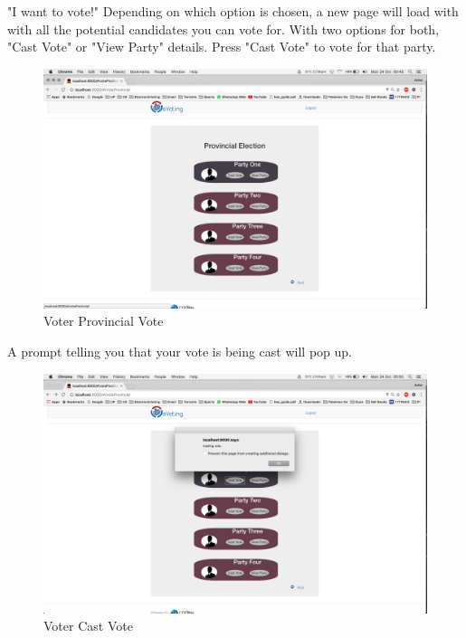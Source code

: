 \documentclass[11pt]{article}
\begin{document}
		"I want to vote!"
		Depending on which option is chosen, a new page will load with with all the potential candidates you can vote for. With two options for both, "Cast Vote" or "View Party" details.
		Press "Cast Vote" to vote for that party. 
		\begin{figure}[H]
			\centering
			\includegraphics[width=0.7\linewidth]{../Images/UserManual/voterWeb/voterrovincialvote.png}
			\caption{Voter  Provincial Vote}
		\end{figure}
		\newpage
			A prompt telling you that your vote is being cast will pop up. 
			\begin{figure}[H]
				\centering
				\includegraphics[width=0.7\linewidth]{../Images/UserManual/voterWeb/votercastvote.png}
				\caption{Voter Cast Vote}
			\end{figure}
		
\end{document}
